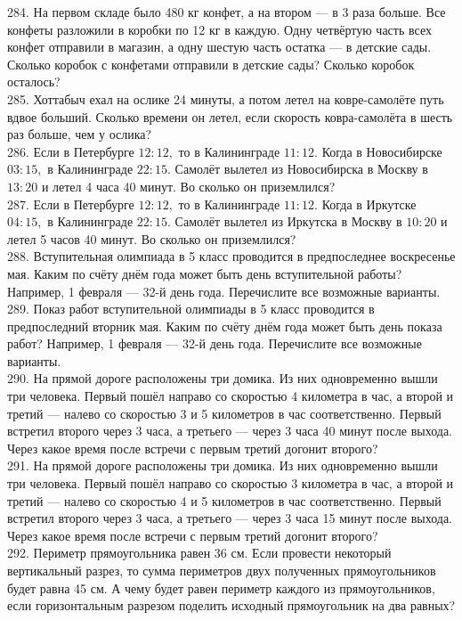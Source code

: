 \documentclass[12pt]{article}
\begin{document}
284. На первом складе было 480 кг конфет, а на втором --- в 3 раза больше. Все конфеты разложили в коробки по 12 кг в каждую. Одну четвёртую часть всех конфет отправили в магазин, а одну шестую часть остатка --- в детские сады. Сколько коробок с конфетами отправили в детские сады? Сколько коробок осталось?\\
285. Хоттабыч ехал на ослике 24 минуты, а потом летел на ковре-самолёте путь вдвое больший. Сколько времени он летел, если скорость ковра-самолёта в шесть раз больше, чем у ослика?\\
286. Если в Петербурге $12:12,$ то в Калининграде $11:12.$ Когда в Новосибирске $03:15,$ в Калининграде $22:15.$ Самолёт вылетел из Новосибирска в Москву в $13:20$ и летел 4 часа 40 минут. Во сколько он приземлился?\\
287. Если в Петербурге $12:12,$ то в Калининграде $11:12.$ Когда в Иркутске $04:15,$ в Калининграде $22:15.$ Самолёт вылетел из Иркутска в Москву в $10:20$ и летел 5 часов 40 минут. Во сколько он приземлился?\\
288. Вступительная олимпиада в 5 класс проводится в предпоследнее воскресенье мая. Каким по счёту днём года может быть день вступительной работы? Например, 1 февраля --- 32-й день года. Перечислите все возможные варианты.\\
289. Показ работ вступительной олимпиады в 5 класс проводится в предпоследний вторник мая. Каким по счёту днём года может быть день показа работ? Например, 1 февраля --- 32-й день года. Перечислите все возможные варианты.\\
290. На прямой дороге расположены три домика. Из них одновременно вышли три человека. Первый пошёл направо со скоростью 4 километра в час, а второй и третий --- налево со скоростью 3 и 5 километров в час соответственно. Первый встретил второго через 3 часа, а третьего --- через 3 часа 40 минут после выхода. Через какое время после встречи с первым третий догонит второго?\\
291. На прямой дороге расположены три домика. Из них одновременно вышли три человека. Первый пошёл направо со скоростью 3 километра в час, а второй и третий --- налево со скоростью 4 и 5 километров в час соответственно. Первый встретил второго через 3 часа, а третьего --- через 3 часа 15 минут после выхода. Через какое время после встречи с первым третий догонит второго?\\
292. Периметр прямоугольника равен 36 см. Если провести некоторый вертикальный разрез, то сумма периметров двух полученных прямоугольников будет равна 45 см. А чему будет равен периметр каждого из прямоугольников, если горизонтальным разрезом поделить исходный прямоугольник на два равных?\\
\end{document}
